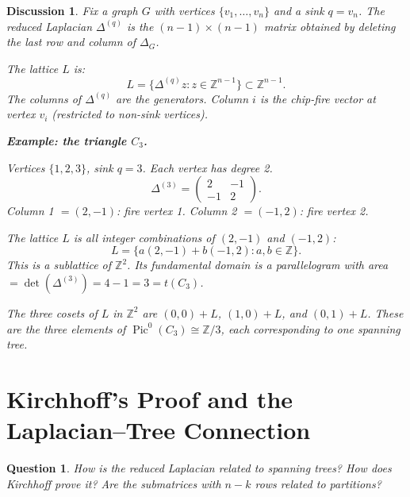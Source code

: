 \documentclass[11pt]{article}
\newcommand{\Z}{\mathbb{Z}}
\newcommand{\Pic}{\operatorname{Pic}^0}
\newtheorem{question}{Question}
\newtheorem{answer}{Discussion}
\begin{document}
\begin{answer}
Fix a graph $G$ with vertices $\{v_1, \ldots, v_n\}$ and a sink $q = v_n$.
The reduced Laplacian $\Delta^{(q)}$ is the $(n-1) \times (n-1)$ matrix
obtained by deleting the last row and column of $\Delta_G$.

The lattice $L$ is:
\[
  L = \{\Delta^{(q)} z : z \in \Z^{n-1}\} \subset \Z^{n-1}.
\]
The columns of $\Delta^{(q)}$ are the generators. Column $i$ is the chip-fire
vector at vertex $v_i$ (restricted to non-sink vertices).

\textbf{Example: the triangle $C_3$.}

Vertices $\{1, 2, 3\}$, sink $q = 3$. Each vertex has degree 2.
\[
  \Delta^{(3)} = \begin{pmatrix} 2 & -1 \\ -1 & 2 \end{pmatrix}.
\]
Column 1 $= (2, -1)$: fire vertex 1. Column 2 $= (-1, 2)$: fire vertex 2.

The lattice $L$ is all integer combinations of $(2, -1)$ and $(-1, 2)$:
\[
  L = \{a(2, -1) + b(-1, 2) : a, b \in \Z\}.
\]
This is a sublattice of $\Z^2$. Its fundamental domain is a parallelogram
with area $= \det(\Delta^{(3)}) = 4 - 1 = 3 = t(C_3)$.

The three cosets of $L$ in $\Z^2$ are $(0,0) + L$, $(1,0) + L$, and
$(0,1) + L$. These are the three elements of $\Pic(C_3) \cong \Z/3$, each
corresponding to one spanning tree.
\end{answer}


\section{Kirchhoff's Proof and the Laplacian--Tree Connection}

\begin{question}
How is the reduced Laplacian related to spanning trees? How does Kirchhoff
prove it? Are the submatrices with $n-k$ rows related to partitions?
\end{question}
\end{document}
